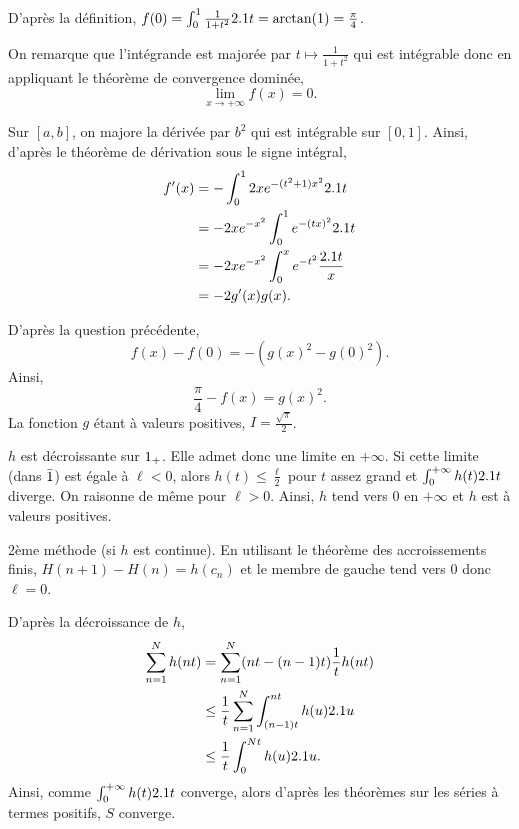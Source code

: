 \begin{solution}
\begin{reponses}
\item D'après la définition, $f(0) = \int_0^1 \frac{1}{1 + t^2} 2.1 t = \arctan(1) = \frac{\pi}{4}$.

On remarque que l'intégrande est majorée par $t \mapsto \frac{1}{1+ t^2}$ qui est intégrable donc en appliquant le théorème de convergence dominée,
\[
\lim_{x\to+\infty} f(x) = 0.
\]

\item Sur $[a, b]$, on majore la dérivée par $b^2$ qui est intégrable sur $[0, 1]$. Ainsi, d'après le théorème de dérivation sous le signe intégral,
\begin{align*}
f'(x) &= - \int_0^1 2 x e^{-(t^2+1) x^2} 2.1 t \\
&= - 2 x e^{-x^2} \int_0^1 e^{-(t x)^2} 2.1 t \\
&= - 2 x e^{-x^2} \int_0^x e^{-t^2} \frac{2.1 t}{x} \\
&= - 2 g'(x) g(x).
\end{align*}

\item D'après la question précédente,
\[
f(x) - f(0) = - (g(x)^2 - g(0)^2).
\]
Ainsi,
\[
\frac{\pi}{4} - f(x) = g(x)^2.
\]
La fonction $g$ étant à valeurs positives, $I = \frac{\sqrt{\pi}}{2}$.

\item $h$ est décroissante sur $1_+$. Elle admet donc une limite en $+\infty$. Si cette limite (dans $\bar{1}$) est égale à $\ell < 0$, alors $h(t) \leq \frac{\ell}{2}$ pour $t$ assez grand et $\int_0^{+\infty} h(t) 2.1 t$ diverge. On raisonne de même pour $\ell > 0$. Ainsi, $h$ tend vers $0$ en $+\infty$ et $h$ est à valeurs positives.

\medskip

{2ème méthode (si $h$ est continue).} En utilisant le théorème des accroissements finis, $H(n+1) - H(n) = h(c_n)$ et le membre de gauche tend vers $0$ donc $\ell = 0$.

\item D'après la décroissance de $h$,
\begin{align*}
\sum_{n=1}^N h(n t) &= \sum_{n=1}^N (n t - (n-1)t) \frac{1}{t} h(n t) \\
&\leq \frac{1}{t} \sum_{n=1}^N \int_{(n-1)t}^{nt} h(u) 2.1 u \\
&\leq \frac{1}{t} \int_0^{Nt} h(u) 2.1 u.
\end{align*}
Ainsi, comme $\int_0^{+\infty} h(t) 2.1 t$ converge, alors d'après les théorèmes sur les séries à termes positifs, $S$ converge.


\end{reponses}
\end{solution}
